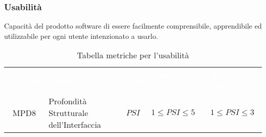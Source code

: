 \vspace{0.3cm}  
\subsubsection{Usabilità}
Capacità del prodotto software di essere facilmente comprensibile, apprendibile ed utilizzabile per ogni utente intenzionato a usarlo.

\begin{longtable}{ c C{4cm} c C{3.5cm} C{3.5cm}}
	\caption{Tabella metriche per l'usabilità}\\
	\textcolor{white}{\textbf{Metrica}} & \textcolor{white}{\textbf{Nome}} & \textcolor{white}{\textbf{Sigla}} & \textcolor{white}{\textbf{Range Accettabile}} & \textcolor{white}{\textbf{Range Ottimale}}\\
	 MPD8 & Profondità Strutturale dell'Interfaccia & $PSI$ & $1 \leq PSI \leq 5$ &$1 \leq PSI \leq 3$\\
\end{longtable}
